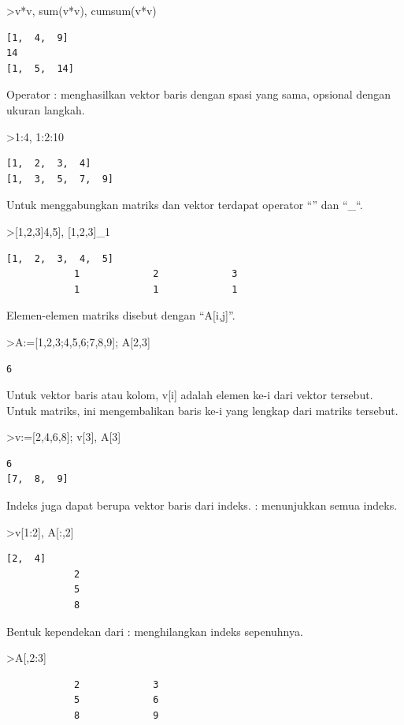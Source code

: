 \documentclass[
]{book}
\begin{document}
\textgreater v*v, sum(v*v), cumsum(v*v)

\begin{verbatim}
[1,  4,  9]
14
[1,  5,  14]
\end{verbatim}

Operator : menghasilkan vektor baris dengan spasi yang sama, opsional dengan ukuran langkah.

\textgreater1:4, 1:2:10

\begin{verbatim}
[1,  2,  3,  4]
[1,  3,  5,  7,  9]
\end{verbatim}

Untuk menggabungkan matriks dan vektor terdapat operator ``\textbar{}'' dan ``\_``.

\textgreater{[}1,2,3{]}\textbar{[}4,5{]}, {[}1,2,3{]}\_1

\begin{verbatim}
[1,  2,  3,  4,  5]
            1             2             3 
            1             1             1 
\end{verbatim}

Elemen-elemen matriks disebut dengan ``A{[}i,j{]}''.

\textgreater A:={[}1,2,3;4,5,6;7,8,9{]}; A{[}2,3{]}

\begin{verbatim}
6
\end{verbatim}

Untuk vektor baris atau kolom, v{[}i{]} adalah elemen ke-i dari vektor tersebut. Untuk matriks, ini mengembalikan baris ke-i yang lengkap dari matriks tersebut.

\textgreater v:={[}2,4,6,8{]}; v{[}3{]}, A{[}3{]}

\begin{verbatim}
6
[7,  8,  9]
\end{verbatim}

Indeks juga dapat berupa vektor baris dari indeks. : menunjukkan semua indeks.

\textgreater v{[}1:2{]}, A{[}:,2{]}

\begin{verbatim}
[2,  4]
            2 
            5 
            8 
\end{verbatim}

Bentuk kependekan dari : menghilangkan indeks sepenuhnya.

\textgreater A{[},2:3{]}

\begin{verbatim}
            2             3 
            5             6 
            8             9 
\end{verbatim}
\end{document}
